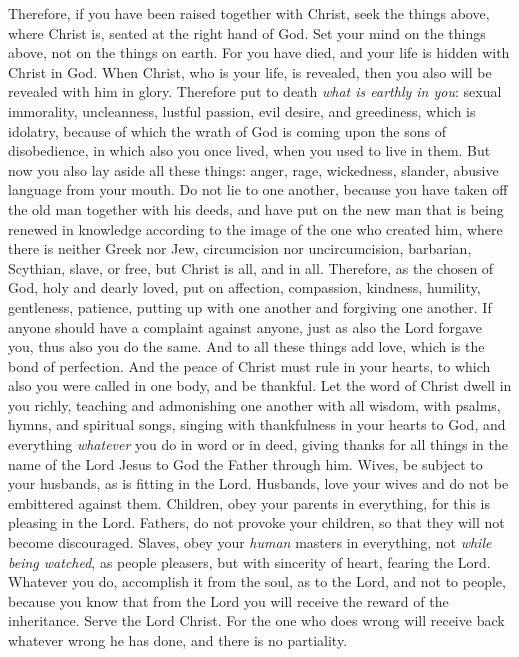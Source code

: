 \begin{biblechapter} %
 Therefore, if you have been raised together with Christ, seek the things above, where Christ is, seated at the right hand of God.
\verse Set your mind on the things above, not on the things on earth.
\verse For you have died, and your life is hidden with Christ in God.
\verse When Christ, who is your life, is revealed, then you also will be revealed with him in glory.
 Therefore put to death \textit{what is earthly in you}: sexual immorality, uncleanness, lustful passion, evil desire, and greediness, which is idolatry,
\verse because of which the wrath of God is coming upon the sons of disobedience,
\verse in which also you once lived, when you used to live in them.
\verse But now you also lay aside all these things: anger, rage, wickedness, slander, abusive language from your mouth.
\verse Do not lie to one another, because you have taken off the old man together with his deeds,
\verse and have put on the new man that is being renewed in knowledge according to the image of the one who created him,
\verse where there is neither Greek nor Jew, circumcision nor uncircumcision, barbarian, Scythian, slave, or free, but Christ is all, and in all.
 Therefore, as the chosen of God, holy and dearly loved, put on affection, compassion, kindness, humility, gentleness, patience,
\verse putting up with one another and forgiving one another. If anyone should have a complaint against anyone, just as also the Lord forgave you, thus also you do the same.
\verse And to all these things add love, which is the bond of perfection.
\verse And the peace of Christ must rule in your hearts, to which also you were called in one body, and be thankful.
\verse Let the word of Christ dwell in you richly, teaching and admonishing one another with all wisdom, with psalms, hymns, and spiritual songs, singing with thankfulness in your hearts to God,
\verse and everything \textit{whatever} you do in word or in deed, giving thanks for all things in the name of the Lord Jesus to God the Father through him.
 Wives, be subject to your husbands, as is fitting in the Lord.
\verse Husbands, love your wives and do not be embittered against them.
\verse Children, obey your parents in everything, for this is pleasing in the Lord.
\verse Fathers, do not provoke your children, so that they will not become discouraged.
\verse Slaves, obey your \textit{human} masters in everything, not \textit{while being watched}, as people pleasers, but with sincerity of heart, fearing the Lord.
\verse Whatever you do, accomplish it from the soul, as to the Lord, and not to people,
\verse because you know that from the Lord you will receive the reward of the inheritance. Serve the Lord Christ.
\verse For the one who does wrong will receive back whatever wrong he has done, and there is no partiality.
\end{biblechapter}

